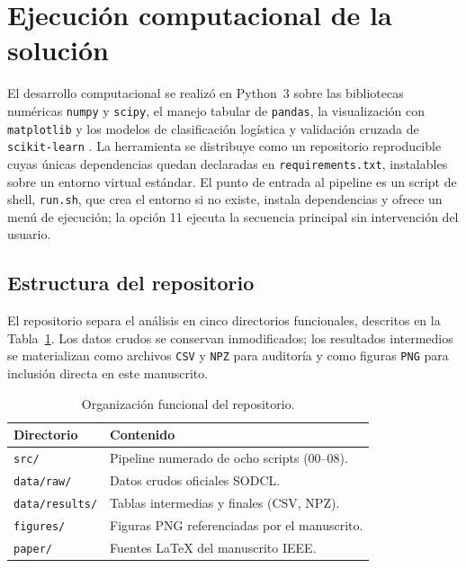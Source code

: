 \documentclass[journal]{IEEEtran}
\begin{document}
\section{Ejecución computacional de la solución}\label{sec:implementacion}

El desarrollo computacional se realizó en Python~3 sobre las bibliotecas numéricas \texttt{numpy} y \texttt{scipy}, el manejo tabular de \texttt{pandas}, la visualización con \texttt{matplotlib} y los modelos de clasificación logística y validación cruzada de \texttt{scikit-learn} \cite{harris2020,virtanen2020,pedregosa2011}. La herramienta se distribuye como un repositorio reproducible cuyas únicas dependencias quedan declaradas en \texttt{requirements.txt}, instalables sobre un entorno virtual estándar. El punto de entrada al pipeline es un script de shell, \texttt{run.sh}, que crea el entorno si no existe, instala dependencias y ofrece un menú de ejecución; la opción 11 ejecuta la secuencia principal sin intervención del usuario.

\subsection{Estructura del repositorio}

El repositorio separa el análisis en cinco directorios funcionales, descritos en la Tabla~\ref{tab:repo}. Los datos crudos se conservan inmodificados; los resultados intermedios se materializan como archivos \texttt{CSV} y \texttt{NPZ} para auditoría y como figuras \texttt{PNG} para inclusión directa en este manuscrito.

\begin{table}[t]
\centering
\small
\caption{Organización funcional del repositorio.}
\label{tab:repo}
\begin{tabular}{@{}lp{}@{}}
\toprule
\textbf{Directorio} & \textbf{Contenido} \\
\midrule
\texttt{src/} & Pipeline numerado de ocho scripts (00--08). \\
\texttt{data/raw/} & Datos crudos oficiales SODCL. \\
\texttt{data/results/} & Tablas intermedias y finales (CSV, NPZ). \\
\texttt{figures/} & Figuras PNG referenciadas por el manuscrito. \\
\texttt{paper/} & Fuentes \LaTeX{} del manuscrito IEEE. \\
\bottomrule
\end{tabular}
\end{table}
\end{document}
